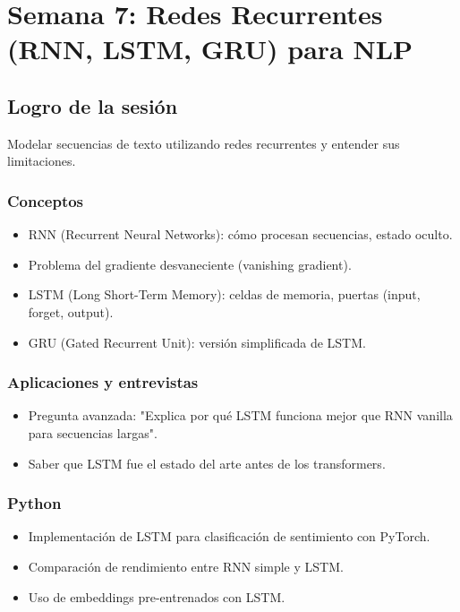 \documentclass[12pt,a4paper,openany,oneside]{book}
\begin{document}
\chapter{Semana 7: Redes Recurrentes (RNN, LSTM, GRU) para NLP}

\section{Logro de la sesión}
Modelar secuencias de texto utilizando redes recurrentes y entender sus limitaciones.

\subsection{Conceptos}
\begin{itemize}
    \item RNN (Recurrent Neural Networks): cómo procesan secuencias, estado oculto.
    \item Problema del gradiente desvaneciente (vanishing gradient).
    \item LSTM (Long Short-Term Memory): celdas de memoria, puertas (input, forget, output).
    \item GRU (Gated Recurrent Unit): versión simplificada de LSTM.
\end{itemize}

\subsection{Aplicaciones y entrevistas}
\begin{itemize}
    \item Pregunta avanzada: "Explica por qué LSTM funciona mejor que RNN vanilla para secuencias largas".
    \item Saber que LSTM fue el estado del arte antes de los transformers.
\end{itemize}

\subsection{Python}
\begin{itemize}
    \item Implementación de LSTM para clasificación de sentimiento con PyTorch.
    \item Comparación de rendimiento entre RNN simple y LSTM.
    \item Uso de embeddings pre-entrenados con LSTM.
\end{itemize}
\end{document}
